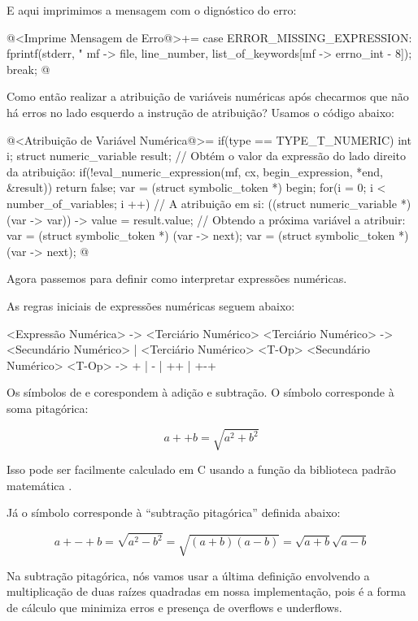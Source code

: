 E aqui imprimimos a mensagem com o dignóstico do erro:

\iniciocodigo
@<Imprime Mensagem de Erro@>+=
case ERROR_MISSING_EXPRESSION:
  fprintf(stderr, "%
          mf -> file, line_number, list_of_keywords[mf -> errno_int - 8]);
  break;
@
\fimcodigo


Como então realizar a atribuição de variáveis numéricas após checarmos
que não há erros no lado esquerdo a instrução de atribuição? Usamos o
código abaixo:

\iniciocodigo
@<Atribuição de Variável Numérica@>=
if(type == TYPE_T_NUMERIC){
  int i;
  struct numeric_variable result;
  // Obtém o valor da expressão do lado direito da atribuição:
  if(!eval_numeric_expression(mf, cx, begin_expression, *end, &result))
    return false;
  var = (struct symbolic_token *) begin;
  for(i = 0; i < number_of_variables; i ++){
    // A atribuição em si:
    ((struct numeric_variable *) (var -> var)) -> value = result.value;
    // Obtendo a próxima variável a atribuir:
    var = (struct symbolic_token *) (var -> next);
    var = (struct symbolic_token *) (var -> next);
  }
}
@
\fimcodigo

Agora passemos para definir como interpretar expressões numéricas.


As regras iniciais de expressões numéricas seguem abaixo:

\alinhaverbatim
<Expressão Numérica> -> <Terciário Numérico>
<Terciário Numérico> -> <Secundário Numérico> |
                        <Terciário Numérico> <T-Op> <Secundário Numérico>
<T-Op> -> + | - | ++ | +-+
\alinhanormal

Os símbolos de \monoespaco{+} e \monoespaco{-} corespondem à adição e
subtração. O símbolo \monoespaco{++} corresponde à soma pitagórica:

$$
a ++ b = \sqrt{a^2 + b^2}
$$

Isso pode ser facilmente calculado em C usando a função da biblioteca
padrão matemática .

Já o símbolo \monoespaco{+-+} corresponde à ``subtração pitagórica''
definida abaixo:

$$
a +-+ b = \sqrt{a^2 - b^2} = \sqrt{(a+b)(a-b)} = \sqrt{a+b}\sqrt{a-b}
$$

Na subtração pitagórica, nós vamos usar a última definição envolvendo
a multiplicação de duas raízes quadradas em nossa implementação, pois
é a forma de cálculo que minimiza erros e presença de overflows e
underflows.

